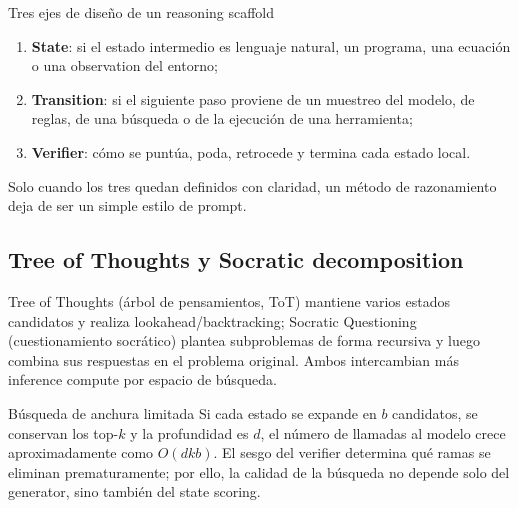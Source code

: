
\begin{importantbox}{Tres ejes de diseño de un reasoning scaffold}
\begin{enumerate}
  \item \textbf{State}: si el estado intermedio es lenguaje natural, un programa, una ecuación o una observation del entorno;
  \item \textbf{Transition}: si el siguiente paso proviene de un muestreo del modelo, de reglas, de una búsqueda o de la ejecución de una herramienta;
  \item \textbf{Verifier}: cómo se puntúa, poda, retrocede y termina cada estado local.
\end{enumerate}
Solo cuando los tres quedan definidos con claridad, un método de razonamiento deja de ser un simple estilo de prompt.
\end{importantbox}

\subsection{Tree of Thoughts y Socratic decomposition}

Tree of Thoughts (árbol de pensamientos, ToT) mantiene varios estados candidatos y realiza lookahead/backtracking; Socratic Questioning (cuestionamiento socrático) plantea subproblemas de forma recursiva y luego combina sus respuestas en el problema original. Ambos intercambian más inference compute por espacio de búsqueda.


\begin{importantbox}{Búsqueda de anchura limitada}
Si cada estado se expande en $b$ candidatos, se conservan los top-$k$ y la profundidad es $d$, el número de llamadas al modelo crece aproximadamente como $O(dkb)$. El sesgo del verifier determina qué ramas se eliminan prematuramente; por ello, la calidad de la búsqueda no depende solo del generator, sino también del state scoring.
\end{importantbox}


